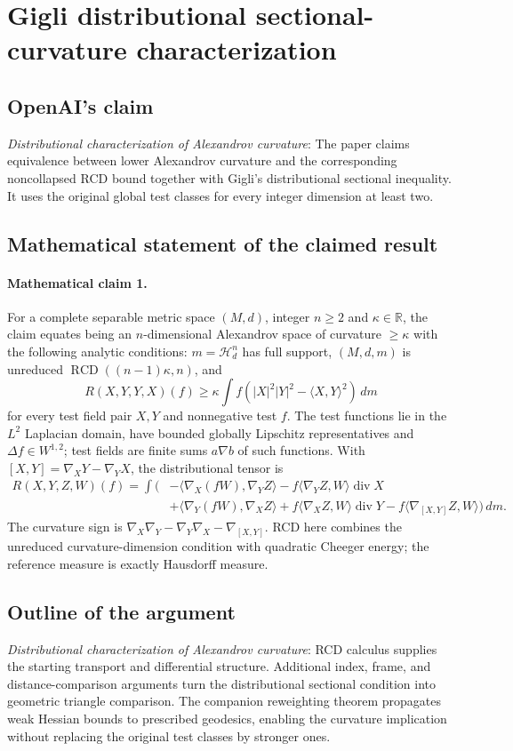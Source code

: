 \documentclass[11pt]{article}
\begin{document}
\section*{Gigli distributional sectional-curvature characterization}

\subsection{OpenAI's claim}
\textit{Distributional characterization of Alexandrov curvature}: The paper claims equivalence between lower Alexandrov curvature and the corresponding noncollapsed RCD bound together with Gigli’s distributional sectional inequality. It uses the original global test classes for every integer dimension at least two.

\subsection{Mathematical statement of the claimed result}
\paragraph{Mathematical claim 1.} For a complete separable metric space $(M,d)$, integer $n\ge2$ and $\kappa\in\mathbb R$, the claim equates being an $n$-dimensional Alexandrov space of curvature $\ge\kappa$ with the following analytic conditions: $m=\mathcal H_d^n$ has full support, $(M,d,m)$ is unreduced $\operatorname{RCD}((n-1)\kappa,n)$, and \[R(X,Y,Y,X)(f)\ge\kappa\int f(|X|^2|Y|^2-\langle X,Y\rangle^2)\,dm\] for every test field pair $X,Y$ and nonnegative test $f$. The test functions lie in the $L^2$ Laplacian domain, have bounded globally Lipschitz representatives and $\Delta f\in W^{1,2}$; test fields are finite sums $a\nabla b$ of such functions. With $[X,Y]=\nabla_XY-\nabla_YX$, the distributional tensor is \[\begin{aligned}R(X,Y,Z,W)(f)=\int\bigl(&-\langle\nabla_X(fW),\nabla_YZ\rangle-f\langle\nabla_YZ,W\rangle\operatorname{div}X\\&+\langle\nabla_Y(fW),\nabla_XZ\rangle+f\langle\nabla_XZ,W\rangle\operatorname{div}Y-f\langle\nabla_{[X,Y]}Z,W\rangle\bigr)\,dm.\end{aligned}\] The curvature sign is $\nabla_X\nabla_Y-\nabla_Y\nabla_X-\nabla_{[X,Y]}$. RCD here combines the unreduced curvature-dimension condition with quadratic Cheeger energy; the reference measure is exactly Hausdorff measure.

\subsection{Outline of the argument}
\textit{Distributional characterization of Alexandrov curvature}: RCD calculus supplies the starting transport and differential structure. Additional index, frame, and distance-comparison arguments turn the distributional sectional condition into geometric triangle comparison. The companion reweighting theorem propagates weak Hessian bounds to prescribed geodesics, enabling the curvature implication without replacing the original test classes by stronger ones.
\end{document}
